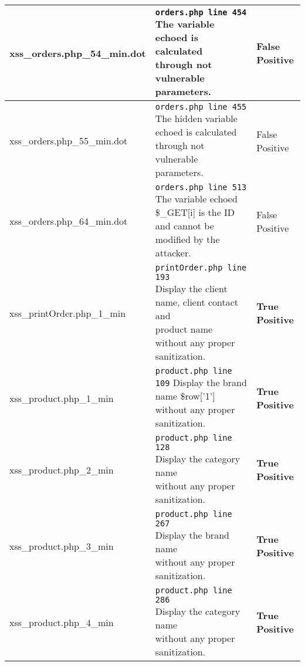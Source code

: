 \documentclass[11pt]{article}
\begin{document}
\begin{longtable}[H]{| p{} | p{} | p{} |}
	 	\hline
	  	xss\_orders.php\_54\_min.dot 	
	  	& \makecell{ \texttt{orders.php line 454} \\
				The variable echoed is calculated \\
				through not vulnerable parameters.}    
	 	& False Positive \\

	 	\hline
	  	xss\_orders.php\_55\_min.dot 	
	  	& \makecell{ \texttt{orders.php line 455} \\
				The hidden variable echoed is calculated \\
				through not vulnerable parameters.}    
	 	& False Positive \\

	 	\hline
	  	xss\_orders.php\_64\_min.dot 	
	  	& \makecell{ \texttt{orders.php line 513} \\
				The variable echoed \$\_GET[i] is the \\
				ID and cannot be modified by the attacker.}    
	 	& False Positive \\

	 	\hline
	  	xss\_printOrder.php\_1\_min 	
	  	& \makecell{ \texttt{printOrder.php line 193} \\
				Display the client name, client contact and \\ product name
				 without any proper sanitization.}  
	 	& \textbf{True Positive}\\

	 	\hline
	  	xss\_product.php\_1\_min 	
	  	& \makecell{ \texttt{product.php line 109} \\
				Display the brand name \$row['1'] \\
				 without any proper sanitization.}  
	 	& \textbf{True Positive}\\

	 	\hline
	  	xss\_product.php\_2\_min 	
	  	& \makecell{ \texttt{product.php line 128} \\
				Display the category name \\
				 without any proper sanitization.}  
	 	& \textbf{True Positive}\\

	 	\hline
	  	xss\_product.php\_3\_min 	
	  	& \makecell{ \texttt{product.php line 267} \\
				Display the brand name \\
				 without any proper sanitization.}  
	 	& \textbf{True Positive}\\

	 	\hline
	  	xss\_product.php\_4\_min 	
	  	& \makecell{ \texttt{product.php line 286} \\
				Display the category name \\
				 without any proper sanitization.}  
	 	& \textbf{True Positive}\\


\end{longtable}
\end{document}
